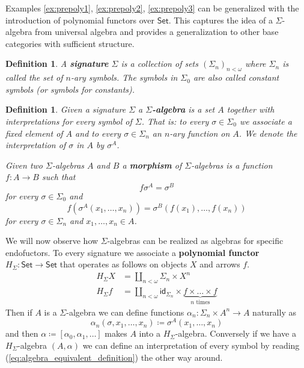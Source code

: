 \documentclass[letterpaper, 11pt, oneside]{memoir}
\theoremstyle{myteo}
\newtheorem{definition}[theorem]{Definition}
\numberwithin{equation}{section}
\newcommand{\marginnote}[1]{\marginpar{\footnotesize #1}}
\newcommand{\id}{\textsf{id}}
\newcommand{\Set}{\textsf{Set}}
\begin{document}
Examples \ref{ex:prepoly1}, \ref{ex:prepoly2}, \ref{ex:prepoly3} can be generalized with the introduction of polynomial functors over \(\Set\).
This captures the idea of a \(\Sigma\)-algebra from universal algebra and provides a generalization to other base categories with sufficient structure.

\begin{definition}
  A \textbf{signature} \(\Sigma\) is a collection of sets \((\Sigma_n)_{n < \omega}\) where \(\Sigma_n\) is called the set of \(n\)-ary symbols.
  \marginnote{signature}
  The symbols in \(\Sigma_0\) are also called constant symbols (or symbols for constants).
\end{definition}

\begin{definition}
  Given a signature \(\Sigma\) a \textbf{\(\Sigma\)-algebra} is a set \(A\) together with interpretations for every symbol of \(\Sigma\).
  \marginnote{\(\Sigma\)-algebra}
  That is: to every \(\sigma \in \Sigma_0\) we associate a fixed element of \(A\) and to every \(\sigma \in \Sigma_n\) an \(n\)-ary function on \(A\).
  We denote the interpretation of \(\sigma\) in \(A\) by \(\sigma^A\).

  Given two \(\Sigma\)-algebras \(A\) and \(B\) a \textbf{morphism} of \(\Sigma\)-algebras is a function \(f \colon A \to B\) such that
  \begin{equation}
    \label{eq:sigma_morphism_condition1}
    f\sigma^A = \sigma ^B
  \end{equation}
  for every \(\sigma \in \Sigma_0\) and
  \begin{equation}
    \label{eq:sigma_morphism_condition2}
    f(\sigma^A(x_1, \ldots, x_n)) = \sigma^B(f(x_1), \ldots, f(x_n))
  \end{equation}
  for every \(\sigma \in \Sigma_n\) and \(x_1, \ldots, x_n \in A\).
\end{definition}

We will now observe how \(\Sigma\)-algebras can be realized as algebras for specific endofuctors.
To every signature we associate a \textbf{polynomial functor} \marginnote{polynomial functor} \(H_\Sigma \colon \Set \to \Set\) that operates as follows on objects \(X\) and arrows \(f\).
\begin{align*}
  H_\Sigma X &= \coprod_{n < \omega} \Sigma_n \times X^n \\
  H_\Sigma f &= \coprod_{n < \omega} \id_{\Sigma_n} \times \underbrace{f \times \ldots \times f}_{\text{\(n\) times}}
\end{align*}
Then if \(A\) is a \(\Sigma\)-algebra we can define functions \(\alpha_n \colon \Sigma_n \times A^n \to A\) naturally as
\begin{equation}
  \label{eq:algebra_equivalent_definition}
  \alpha_n(\sigma, x_1, \ldots, x_n) \coloneqq \sigma^A(x_1, \ldots, x_n)
\end{equation}
and then \(\alpha \coloneqq \left[\alpha_0, \alpha_1, \ldots \right]\) makes \(A\) into a \(H_\Sigma\)-algebra.
Conversely if we have a \(H_\Sigma\)-algebra \((A, \alpha)\) we can define an interpretation of every symbol by reading (\ref{eq:algebra_equivalent_definition}) the other way around.
\end{document}
